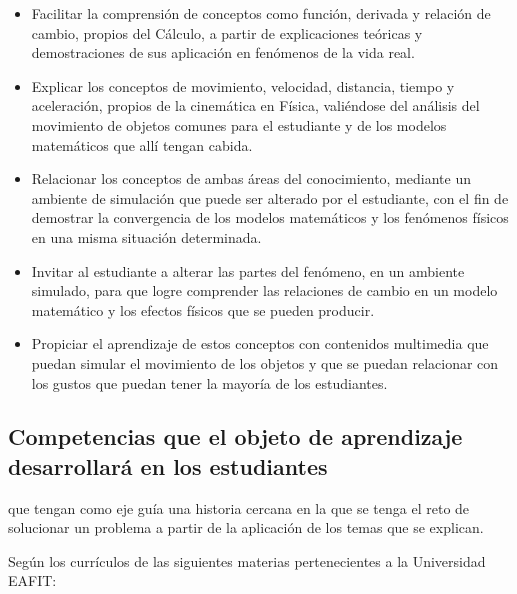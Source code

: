 \documentclass[twoside,letterpaper,11pt]{report}
\begin{document}
\begin{itemize}
	\item Facilitar la comprensión de conceptos como función, derivada y relación de cambio, propios del Cálculo, a partir de explicaciones teóricas y demostraciones de sus aplicación en fenómenos de la vida real.

	\item Explicar los conceptos de movimiento, velocidad, distancia, tiempo y aceleración, propios de la cinemática en Física, valiéndose del análisis del movimiento de objetos comunes para el estudiante y de los modelos matemáticos que allí tengan cabida.

	\item Relacionar los conceptos de ambas áreas del conocimiento, mediante un ambiente de simulación que puede ser alterado por el estudiante, con el fin de demostrar la convergencia de los modelos matemáticos y los fenómenos físicos en una misma situación determinada.

	\item Invitar al estudiante a alterar las partes del fenómeno, en un ambiente simulado, para que logre comprender las relaciones de cambio en un modelo matemático y los efectos físicos que se pueden producir.

	\item Propiciar el aprendizaje de estos conceptos con contenidos multimedia que puedan simular el movimiento de los objetos y que se puedan relacionar con los gustos que puedan tener la mayoría de los estudiantes.

\end{itemize}


\subsection{Competencias que el objeto de aprendizaje desarrollará en los estudiantes } %



 que tengan como eje guía una historia cercana en la que se tenga el reto de solucionar un problema a partir de la aplicación de los temas que se explican.

 Según los currículos de las siguientes materias pertenecientes a la Universidad EAFIT:
\end{document}
